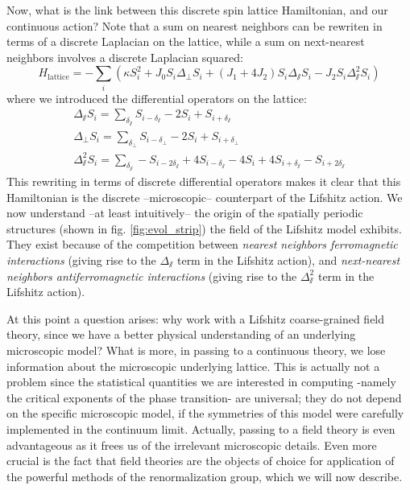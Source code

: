  Now, what is the link between this discrete spin lattice Hamiltonian, and our continuous action?
Note that a sum on nearest neighbors can be rewriten in terms of a discrete Laplacian on the lattice, while a sum on next-nearest neighbors involves a discrete Laplacian squared:
\begin{equation}
H_{\text{lattice}} = -\sum_i \left( \kappa S_i^2 + J_0 S_i \Delta_\perp S_i + (J_1 + 4 J_2) S_i \Delta_\sslash S_i - J_2 S_i \Delta_\sslash^2 S_i \right)
\end{equation}
where we introduced the differential operators on the lattice:
\begin{align}
\Delta_\sslash S_i = \sum_{\delta_\sslash} S_{i-\delta_\sslash} - 2 S_i + S_{i+\delta_\sslash} \\
\Delta_\perp S_i = \sum_{\delta_\perp} S_{i-\delta_\perp} - 2 S_i + S_{i+\delta_\perp} \\
\Delta_\sslash^2 S_i = \sum_{\delta_\sslash} -S_{i-2\delta_\sslash} +  4 S_{i-\delta_\sslash} - 4 S_i + 4S_{i+\delta_\sslash} - S_{i+2\delta_\sslash}
\end{align}
This rewriting in terms of discrete differential operators makes it clear that this Hamiltonian is the discrete --microscopic-- counterpart of the Lifshitz action. We now understand --at least intuitively-- the origin of the spatially periodic structures (shown in fig. \eqref{fig:evol_strip}) the field of the Lifshitz model exhibits. They exist because of the competition between \textit{nearest neighbors ferromagnetic interactions} (giving rise to the $\Delta_\sslash$ term in the Lifshitz action), and \textit{next-nearest neighbors antiferromagnetic interactions} (giving rise to the $\Delta_\sslash^2$ term in the Lifshitz action).

At this point a question arises: why work with a Lifshitz coarse-grained field theory, since we have a better physical understanding of an underlying microscopic model? What is more, in passing to a continuous theory, we lose information about the microscopic underlying lattice. 
This is actually not a problem since the statistical quantities we are interested in computing -namely the critical exponents of the phase transition- are universal; they do not depend on the specific microscopic model, if the symmetries of this model were carefully implemented in the continuum limit. Actually, passing to a field theory is even advantageous as it frees us of the irrelevant microscopic details. 
Even more crucial is the fact that field theories are the objects of choice for application of the powerful methods of the renormalization group, which we will now describe.